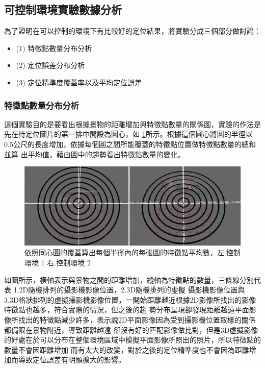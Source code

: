\subsection{可控制環境實驗數據分析}

	為了證明在可以控制的環境下有比較好的定位結果，將實驗分成三個部分做討論：
	
\begin{itemize}
  \item (1) 特徵點數量分布分析
  \item (2) 定位誤差分布分析
  \item (3) 定位精準度覆蓋率以及平均定位誤差
\end{itemize}
		
\subsubsection{特徵點數量分布分析}

	這個實驗目的是要看出根據景物的距離增加與特徵點數量的關係圖，實驗的作法是先在待定位圖片的第一排中間設為圓心，如
\ref{fig:CoverDisk}所示。根據這個圓心將圓的半徑以 0.5公尺的長度增加，依據每個圓之間所能覆蓋的特徵點位置做特徵點數量的總和並算
出平均值，藉由圖中的趨勢看出特徵點數量的變化。

\begin{figure}
\begin{center}
  \includegraphics[width=1.0\textwidth]{figures/CoverDisk.jpg}
  \caption{依照同心圓的覆蓋算出每個半徑內的每張圖的特徵點平均數，左.控制環境 1 右.控制環境 2}
  \label{fig:CoverDisk}
\end{center}
\end{figure}
	
	如圖所示，橫軸表示與景物之間的距離增加，縱軸為特徵點的數量，三條線分別代表 1.2D隨機排列的攝影機影像位置，2.3D隨機排列的虛擬
攝影機影像位置與 3.3D格狀排列的虛擬攝影機影像位置，一開始距離越近根據2D影像所找出的影像特徵點也越多，符合實際的情況，但之後的趨
勢分布呈現卻發現距離越遠平面影像所找出的特徵點減少許多，表示說2D平面影像因為受到攝影機位置取樣的關係都侷限在景物附近，導致距離越遠
卻沒有好的匹配影像做比對，但是3D虛擬影像的好處在於可以分布在整個環境區域中模擬平面影像所照出的照片，所以特徵點的數量不會因距離增加
而有太大的改變，對於之後的定位精準度也不會因為距離增加而導致定位誤差有明顯擴大的影響。
			
	
\begin{figure}
\begin{center}
	
	
\end{center}
\end{figure}
	
	
	

